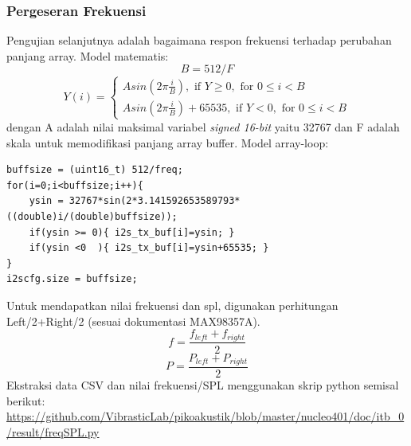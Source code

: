 \documentclass[12pt,]{article}
\begin{document}
  	\subsubsection{Pergeseran Frekuensi}
  	Pengujian selanjutnya adalah bagaimana respon frekuensi terhadap perubahan panjang array.
  	Model matematis:
  	\[ B = 512/F \]
  	\[
  	Y(i) = 
  	\begin{cases}
  	A sin(2 \pi \frac{i}{B}), \text{ if } Y \geq 0, \text{ for } 0 \leq i < B\\ 
  	A sin(2 \pi \frac{i}{B})+65535, \text{ if } Y < 0, \text{ for } 0 \leq i < B
  	\end{cases}
  	\]
  	dengan A adalah nilai maksimal variabel \textit{signed 16-bit} yaitu 32767
  	dan F adalah skala untuk memodifikasi panjang array buffer.
  	Model array-loop:
  	\begin{verbatim}
buffsize = (uint16_t) 512/freq;
for(i=0;i<buffsize;i++){
	ysin = 32767*sin(2*3.141592653589793*((double)i/(double)buffsize));
	if(ysin >= 0){ i2s_tx_buf[i]=ysin; }
	if(ysin <0  ){ i2s_tx_buf[i]=ysin+65535; }
}
i2scfg.size = buffsize;
  	\end{verbatim}
  	Untuk mendapatkan nilai frekuensi dan spl, digunakan perhitungan Left/2+Right/2 (sesuai dokumentasi MAX98357A).
  	\[ f = \frac{f_{left} + f_{right}}{2}  \]
  	\[ P = \frac{P_{left} + P_{right}}{2}  \]
  	Ekstraksi data CSV dan nilai frekuensi/SPL menggunakan skrip python semisal berikut:\\
  	\url{https://github.com/VibrasticLab/pikoakustik/blob/master/nucleo401/doc/itb_0/result/freqSPL.py} 
  	
\end{document}
